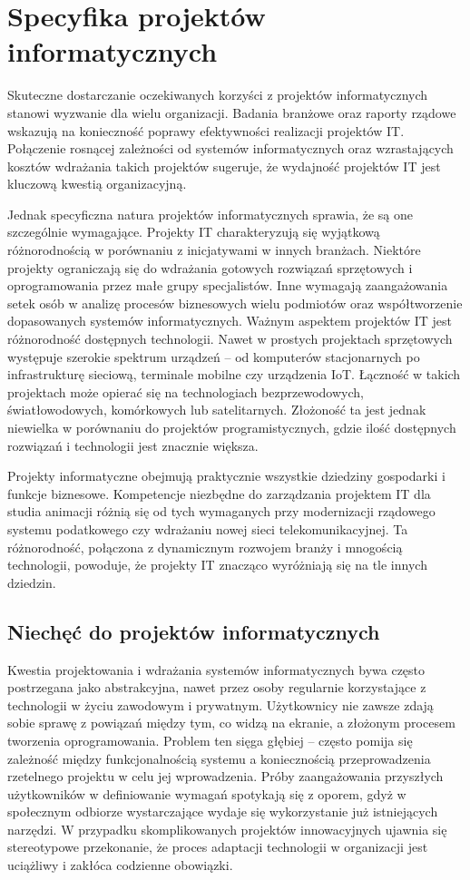 \newpage
\section{Specyfika projektów informatycznych}
Skuteczne dostarczanie oczekiwanych korzyści z projektów informatycznych stanowi wyzwanie dla wielu organizacji. \autocite{robey} Badania branżowe \autocite{rubinstein} oraz raporty rządowe \autocite{canada}\autocite{gov} wskazują na konieczność poprawy efektywności realizacji projektów IT. Połączenie rosnącej zależności od systemów informatycznych oraz wzrastających kosztów wdrażania takich projektów sugeruje, że wydajność projektów IT jest kluczową kwestią organizacyjną. \autocite{ryzyka}

Jednak specyficzna natura projektów informatycznych sprawia, że są one szczególnie wymagające. Projekty IT charakteryzują się wyjątkową różnorodnością w porównaniu z inicjatywami w innych branżach. Niektóre projekty ograniczają się do wdrażania gotowych rozwiązań sprzętowych i oprogramowania przez małe grupy specjalistów. Inne wymagają zaangażowania setek osób w analizę procesów biznesowych wielu podmiotów oraz współtworzenie dopasowanych systemów informatycznych. Ważnym aspektem projektów IT jest różnorodność dostępnych technologii. Nawet w prostych projektach sprzętowych występuje szerokie spektrum urządzeń – od komputerów stacjonarnych po infrastrukturę sieciową, terminale mobilne czy urządzenia IoT. Łączność w takich projektach może opierać się na technologiach bezprzewodowych, światłowodowych, komórkowych lub satelitarnych. Złożoność ta jest jednak niewielka w porównaniu do projektów programistycznych, gdzie ilość dostępnych rozwiązań i technologii jest znacznie większa.

Projekty informatyczne obejmują praktycznie wszystkie dziedziny gospodarki i funkcje biznesowe. Kompetencje niezbędne do zarządzania projektem IT dla studia animacji różnią się od tych wymaganych przy modernizacji rządowego systemu podatkowego czy wdrażaniu nowej sieci telekomunikacyjnej. Ta różnorodność, połączona z dynamicznym rozwojem branży i mnogością technologii, powoduje, że projekty IT znacząco wyróżniają się na tle innych dziedzin. \autocite{ITPM}

\subsection{Niechęć do projektów informatycznych}
Kwestia projektowania i wdrażania systemów informatycznych bywa często postrzegana jako abstrakcyjna, nawet przez osoby regularnie korzystające z technologii w życiu zawodowym i prywatnym. Użytkownicy nie zawsze zdają sobie sprawę z powiązań między tym, co widzą na ekranie, a złożonym procesem tworzenia oprogramowania. Problem ten sięga głębiej – często pomija się zależność między funkcjonalnością systemu a koniecznością przeprowadzenia rzetelnego projektu w celu jej wprowadzenia. Próby zaangażowania przyszłych użytkowników w definiowanie wymagań spotykają się z oporem, gdyż w społecznym odbiorze wystarczające wydaje się wykorzystanie już istniejących narzędzi. W przypadku skomplikowanych projektów innowacyjnych ujawnia się stereotypowe przekonanie, że proces adaptacji technologii w organizacji jest uciążliwy i zakłóca codzienne obowiązki.

